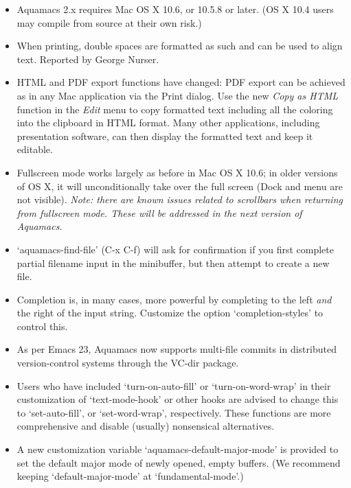 \begin{itemize}

\item Aquamacs 2.x requires Mac OS X 10.6, or 10.5.8 or later.  (OS X 10.4 users may compile from source at their own risk.)


\item When printing, double spaces are formatted as such and can be used to align text.
Reported by George Nurser.


\item HTML and PDF export functions have changed: PDF export can be achieved as in any Mac application via the Print dialog.  Use the new \emph{Copy as HTML} function in the \emph{Edit} menu to copy formatted text including all the coloring into the clipboard in HTML format.  Many other applications, including presentation software, can then display the formatted text and keep it editable.

\item Fullscreen mode works largely as before in Mac OS X 10.6; in older versions of OS X, it will unconditionally take over the full screen (Dock and menu are not visible).  \emph{Note: there are known issues related to scrollbars when returning from fullscreen mode.  These will be addressed in the next version of Aquamacs.}

\item `aquamacs-find-file' (C-x C-f) will ask for confirmation if you first complete partial filename input in the minibuffer, but then attempt to create a new file.
\item Completion is, in many cases, more powerful by completing to the left \emph{and} the right of the input string.  Customize the option `completion-styles' to control this.

\item As per Emacs 23, Aquamacs now supports multi-file commits in distributed version-control systems through the VC-dir package.

\item Users who have included `turn-on-auto-fill' or `turn-on-word-wrap' in their customization of `text-mode-hook' or other hooks are advised to change this to `set-auto-fill', or `set-word-wrap', respectively.  These functions are more comprehensive and disable (usually) nonsensical alternatives.


\item A new customization variable `aquamacs-default-major-mode' is provided to set the default major mode of newly opened, empty buffers.  (We recommend keeping `default-major-mode' at `fundamental-mode'.)


\end{itemize}
